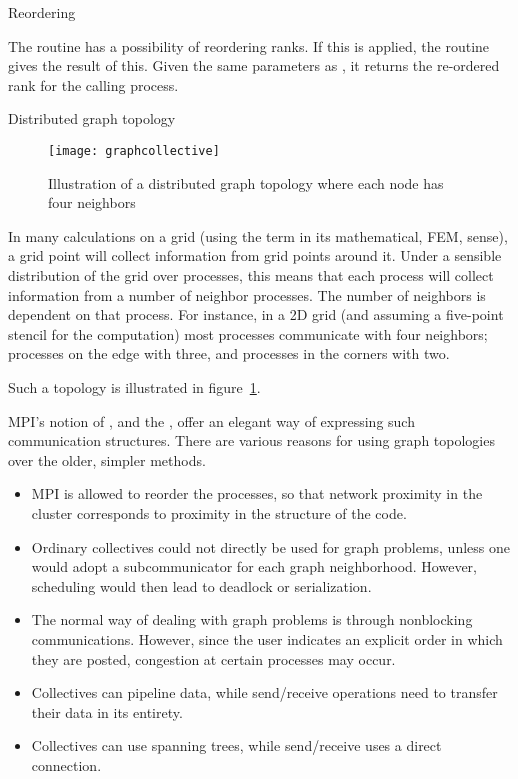 
 {Reordering}
\label{sec:mpi-cart-map}

The  routine has a possibility
of reordering ranks. If this is applied,
the routine  gives the result of this.
Given the same parameters as ,
it returns the re-ordered rank for the calling process.

 {Distributed graph topology}
\label{sec:mpi-dist-graph}

\begin{figure}[ht]
  \texttt{[image: graphcollective]}
  \caption{Illustration of a distributed graph topology where each
    node has four neighbors}
  \label{fig:graphcollective}
\end{figure}

In many calculations on a grid (using the term in its mathematical,
\ac{FEM}, sense), a grid point will collect information from grid
points around it. Under a sensible distribution of the grid over
processes, this means that each process will collect information from
a number of neighbor processes. The number of 
neighbors is dependent on that process. For instance, in a 2D
grid (and assuming a five-point stencil for the computation) most
processes communicate with four neighbors; processes on the edge with
three, and processes in the corners with two.

Such a topology is illustrated in figure~\ref{fig:graphcollective}.

MPI's notion of , and the
, offer an elegant way of
expressing such communication structures. There are various reasons
for using graph topologies over the older, simpler methods.
\begin{itemize}
\item MPI is allowed to reorder the processes, so that network proximity
  in the cluster corresponds to proximity in the structure of the
  code.
\item Ordinary collectives could not directly be used for graph
  problems, unless one would adopt a subcommunicator for each graph
  neighborhood. However, scheduling would then lead to deadlock or
  serialization.
\item The normal way of dealing with graph problems is through
  nonblocking communications. However, since the user indicates an
  explicit order in which they are posted, congestion at certain
  processes may occur.
\item Collectives can pipeline data, while send/receive operations
  need to transfer their data in its entirety.
\item Collectives can use spanning trees, while send/receive uses a
  direct connection.
\end{itemize}


